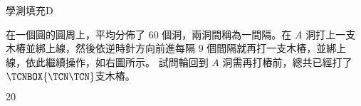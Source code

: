     \begin{QUESTION}
        \begin{ExamInfo}{91}{學測}{填充}{D}
        \end{ExamInfo}
        \begin{ExamAnsRateInfo}{50}{67}{53}{30}
        \end{ExamAnsRateInfo}
        \begin{QBODY}
            在一個圓的圓周上，平均分佈了 $60$ 個洞，兩洞間稱為一間隔。在 $A$ 洞打上一支木樁並綁上線，然後依逆時針方向前進每隔 $9$ 個間隔就再打一支木樁，並綁上線，依此繼續操作，如右圖所示。 試問輪回到 $A$ 洞需再打樁前，總共已經打了$\TCNBOX{{\TCN\TCN}}$支木樁。\\
            
        \end{QBODY}
        \begin{QFROMS}
        \end{QFROMS}
        \begin{QTAGS}\end{QTAGS}
        \begin{QANS}
            $20$
        \end{QANS}
        \begin{QSOLLIST}
        \end{QSOLLIST}
        \begin{QEMPTYSPACE}
        \end{QEMPTYSPACE}
    \end{QUESTION}
